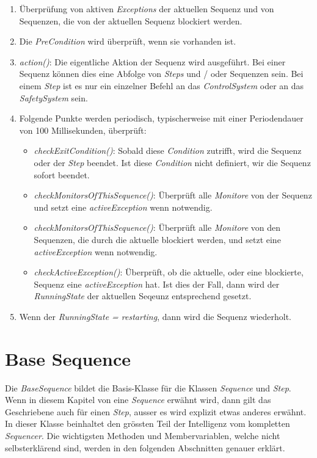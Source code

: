 \begin{enumerate}
\item Überprüfung von aktiven \textit{Exceptions} der aktuellen Sequenz und von Sequenzen, die von der aktuellen Sequenz blockiert werden.
\item Die \textit{PreCondition} wird überprüft, wenn sie vorhanden ist.
\item \textit{action()}: Die eigentliche Aktion der Sequenz wird ausgeführt. Bei einer Sequenz können dies eine Abfolge von \textit{Steps} und / oder Sequenzen sein. Bei einem \textit{Step} ist es nur ein einzelner Befehl an das \textit{ControlSystem} oder an das \textit{SafetySystem} sein.
\item Folgende Punkte werden periodisch, typischerweise mit einer Periodendauer von 100 Millisekunden, überprüft:
\begin{itemize}
\item \textit{checkExitCondition()}: Sobald diese \textit{Condition} zutrifft, wird die Sequenz oder der \textit{Step} beendet. Ist diese \textit{Condition} nicht definiert, wir die Sequenz sofort beendet.
\item \textit{checkMonitorsOfThisSequence()}: Überprüft alle \textit{Monitore} von der Sequenz und setzt eine \textit{activeException} wenn notwendig.
\item \textit{checkMonitorsOfThisSequence()}: Überprüft alle \textit{Monitore} von den Sequenzen, die durch die aktuelle blockiert werden, und setzt eine \textit{activeException} wenn notwendig.
\item \textit{checkActiveException()}: Überprüft, ob die aktuelle, oder eine blockierte, Sequenz eine \textit{activeException} hat. Ist dies der Fall, dann wird der \textit{RunningState} der aktuellen Seqeunz entsprechend gesetzt. 
\end{itemize}
\item Wenn der \textit{RunningState = restarting}, dann wird die Sequenz wiederholt.
\end{enumerate} 



\section{Base Sequence}
Die \textit{BaseSequence} bildet die Basis-Klasse für die Klassen \textit{Sequence} und \textit{Step}.
Wenn in diesem Kapitel von eine \textit{Sequence} erwähnt wird, dann gilt das Geschriebene auch für einen \textit{Step}, ausser es wird explizit etwas anderes erwähnt.
In dieser Klasse beinhaltet den grössten Teil der Intelligenz vom kompletten \textit{Sequencer}.
Die wichtigsten Methoden und Membervariablen, welche nicht selbsterklärend sind, werden in den folgenden Abschnitten genauer erklärt.


